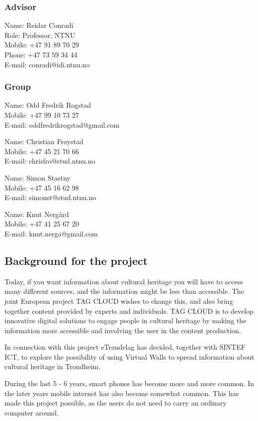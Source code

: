 \documentclass[11pt]{book}
\begin{document}
\subsubsection{Advisor}
Name: Reidar Conradi\\
Role: Professor, NTNU\\
Mobile: +47 91 89 70 29\\
Phone: +47 73 59 34 44\\
E-mail: conradi@idi.ntnu.no

\subsubsection{Group}
Name: Odd Fredrik Rogstad\\
Mobile: +47 99 10 73 27\\
E-mail: oddfredrikrogstad@gmail.com

Name: Christian Frøystad\\
Mobile: +47 45 21 70 66\\
E-mail: chrisfro@stud.ntnu.no

Name: Simon Stastny\\
Mobile: +47 45 16 62 98\\
E-mail: simonst@stud.ntnu.no

Name: Knut Nergård\\
Mobile: +47 41 25 67 20\\
E-mail: knut.nerga@gmail.com

\subsection{Background for the project}
Today, if you want information about cultural heritage you will have to access many different sources, and the information might be less than accessible. The joint European project TAG CLOUD wishes to change this, and also bring together content provided by experts and individuals. TAG CLOUD is to develop innovative digital solutions to engage people in cultural heritage by making the information more accessible and involving the user in the content production.

In connection with this project eTrøndelag has decided, together with SINTEF ICT, to explore the possibility of using Virtual Walls to spread information about cultural heritage in Trondheim.

During the last 5 - 6 years, smart phones has become more and more common. In the later years mobile internet has also become somewhat common. This has made this project possible, as the users do not need to carry an ordinary computer around.
\end{document}
